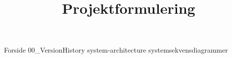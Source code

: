 \documentclass[a4paper,openany]{memoir}
\title{Projektformulering}
\begin{document}
	{Forside}  \newpage
	\tableofcontents\thispagestyle{fancy}
	{00_VersionHistory}  \newpage
	{system-architecture}  \newpage
	{systemsekvensdiagrammer}  \newpage
	
	
	




	 {}
	\printbibliography
\end{document}
